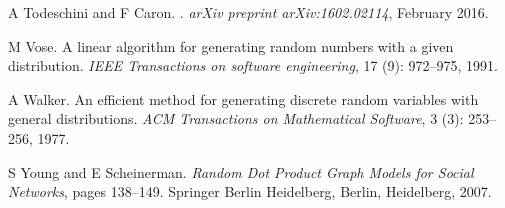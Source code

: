 \documentclass[twoside,11pt]{article}
\begin{document}
\begin{thebibliography}{13}
A {Todeschini} and F {Caron}.
.
\newblock \emph{arXiv preprint arXiv:1602.02114}, February 2016.

M Vose.
\newblock A linear algorithm for generating random numbers with a given
  distribution.
\newblock \emph{IEEE Transactions on software engineering}, 17
  (9): 972--975, 1991.

A  Walker.
\newblock An efficient method for generating discrete random variables with
  general distributions.
\newblock \emph{ACM Transactions on Mathematical Software}, 3
  (3): 253--256, 1977.

S  Young and E  Scheinerman.
\newblock \emph{Random Dot Product Graph Models for Social Networks}, pages
  138--149.
\newblock Springer Berlin Heidelberg, Berlin, Heidelberg, 2007.

\end{thebibliography}
\end{document}
